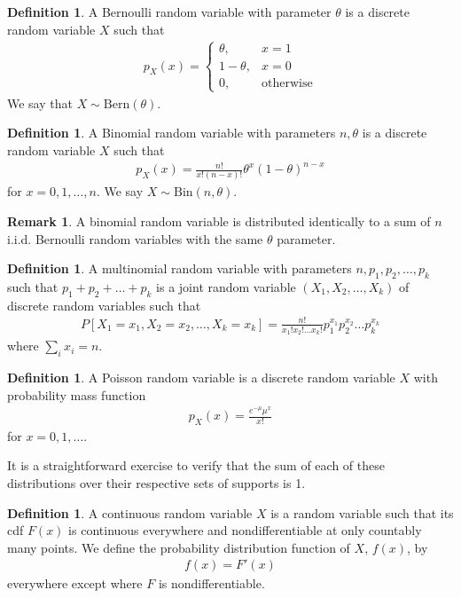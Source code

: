 \documentclass[11pt]{amsart}
\theoremstyle{definition}
\newtheorem{definition}[theorem]{Definition}
\newtheorem{remark}[theorem]{Remark}
\numberwithin{equation}{section}
\begin{document}
\begin{definition}
    A Bernoulli random variable with parameter $\theta$ is a discrete random variable $X$ such that 
    \begin{align*}
        p_X(x)=\begin{cases}
            \theta, & x=1\\
            1-\theta, & x=0\\
            0, & \text{otherwise}
        \end{cases}
    \end{align*}
    We say that $X\sim\mathrm{Bern}(\theta)$.
\end{definition}
\begin{definition}
    A Binomial random variable with parameters $n,\theta$ is a discrete random variable $X$ such that 
    \begin{align*}
        p_X(x)=\frac{n!}{x!(n-x)!}\theta^x(1-\theta)^{n-x}
    \end{align*}
    for $x=0,1,\ldots,n$. We say $X\sim\mathrm{Bin}(n,\theta)$.
\end{definition}
\begin{remark}
    A binomial random variable is distributed identically to a sum of $n$ i.i.d. Bernoulli random variables with the same $\theta$ parameter.
\end{remark}
\begin{definition}
    A multinomial random variable with parameters $n,p_1,p_2,\ldots,p_k$ such that $p_1+p_2+\ldots+p_k$ is a joint random variable $(X_1,X_2,\ldots,X_k)$ of discrete random variables such that 
    \begin{align*}
        P[X_1=x_1,X_2=x_2,\ldots,X_k=x_k]=\frac{n!}{x_1!x_2!\ldots x_k!}p_1^{x_1}p_2^{x_2}\ldots p_k^{x_k}
    \end{align*}
    where $\sum_ix_i=n$.
\end{definition}
\begin{definition}
    A Poisson random variable is a discrete random variable $X$ with probability mass function
    \begin{align*}
        p_X(x)=\frac{e^{-\mu}\mu^x}{x!}
    \end{align*}
    for $x=0,1,\ldots$.
\end{definition}
It is a straightforward exercise to verify that the sum of each of these distributions over their respective sets of supports is 1.
\begin{definition}
    A continuous random variable $X$ is a random variable such that its cdf $F(x)$ is continuous everywhere and nondifferentiable at only countably many points. We define the probability distribution function of $X$, $f(x)$, by
    \begin{align*}
        f(x)=F'(x)
    \end{align*}
    everywhere except where $F$ is nondifferentiable.
\end{definition}
\end{document}
